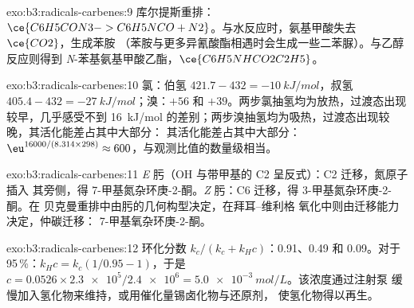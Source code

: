 \begin{solution}{exo:b3:radicals-carbenes:9}
库尔提斯重排：$\ce{C6H5CON3 -> C6H5NCO + N2}$。与水反应时，氨基甲酸失去 $\ce{CO2}$，生成苯胺
（苯胺与更多异氰酸酯相遇时会生成一些二苯脲）。与乙醇反应则得到
\textit{N}-苯基氨基甲酸乙酯，$\ce{C6H5NHCO2C2H5}$。
\end{solution}

\begin{solution}{exo:b3:radicals-carbenes:10}
氯：伯氢 $421.7 - 432 = \qty{-10}{kJ/mol}$，叔氢 $405.4 - 432 = \qty{-27}{kJ/mol}$；溴：$+56$ 和
$+39$。两步氯抽氢均为放热，过渡态出现较早，几乎感受不到
\qty{16}{kJ/mol} 的差别；两步溴抽氢均为吸热，过渡态出现较晚，其活化能差占其中大部分：
其活化能差占其中大部分：
$\eu^{16000/(8.314 \times 298)} \approx 600$，与观测比值的数量级相当。
\end{solution}

\begin{solution}{exo:b3:radicals-carbenes:11}
\textit{E} 肟（OH 与带甲基的 C2 呈反式）：C2 迁移，氮原子插入
其旁侧，得 7-甲基氮杂环庚-2-酮。\textit{Z} 肟：C6 迁移，得 3-甲基氮杂环庚-2-酮。在
贝克曼重排中由肟的几何构型决定，在拜耳–维利格
氧化中则由迁移能力决定，仲碳迁移：
7-甲基氧杂环庚-2-酮。
\end{solution}

\begin{solution}{exo:b3:radicals-carbenes:12}
环化分数 $k_c/(k_c + k_H c)$：0.91、0.49 和 0.09。对于 95\,\%：$k_Hc = k_c(1/0.95 - 1)$，于是
$c = 0.0526 \times \num{2.3e5}/\num{2.4e6} = \qty{5.0e-3}{mol/L}$。该浓度通过注射泵
缓慢加入氢化物来维持，或用催化量锡卤化物与还原剂，
使氢化物得以再生。
\end{solution}

